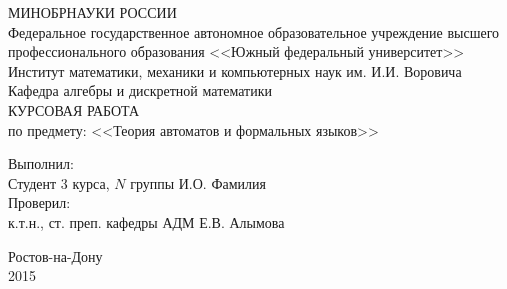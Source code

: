 \documentclass[fleqn,12pt, a4paper]{article}
\newcommand {\eps} {\varepsilon}
\begin{document}

\begin{titlepage}

\begin{center} 
\MakeUppercase{Минобрнауки России}\\
Федеральное государственное автономное образовательное учреждение
высшего профессионального образования
<<Южный федеральный университет>>\\[1 cm]

Институт математики, механики и компьютерных наук им. И.И. Воровича\\[1 cm]

Кафедра алгебры и дискретной математики\\[5cm]

\Huge \MakeUppercase{Курсовая работа} \\[0.6cm]

\large по предмету: <<Теория автоматов и формальных языков>>\\[7cm]

\end{center}

\begin{flushleft}
{\large 
Выполнил: \\
Студент 3 курса, $N$ группы \hfill И.О. Фамилия \\[1cm]

Проверил:\\
к.т.н., ст. преп. кафедры АДМ \hfill Е.В. Алымова}

\end{flushleft}
\vfill

\begin{center}
Ростов-на-Дону\\
2015
\end{center}
\end{titlepage}


\end{document}
